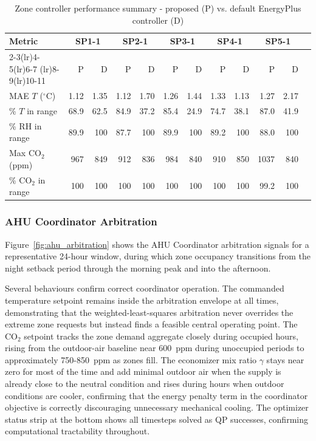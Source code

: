 \documentclass[12pt, a4paper]{article}
\begin{document}
	\begin{table}[htbp]
		\centering
		\small
		\caption{Zone controller performance summary - proposed (P) vs.
			default EnergyPlus controller (D)}
		\label{tab:zone_perf}
		\begin{tabular}{lrrrrrrrrrrr}
			\toprule
			\textbf{Metric}
			& \multicolumn{2}{c}{\textbf{SP1-1}}
			& \multicolumn{2}{c}{\textbf{SP2-1}}
			& \multicolumn{2}{c}{\textbf{SP3-1}}
			& \multicolumn{2}{c}{\textbf{SP4-1}}
			& \multicolumn{2}{c}{\textbf{SP5-1}} \\
			\cmidrule(lr){2-3}\cmidrule(lr){4-5}\cmidrule(lr){6-7}
			\cmidrule(lr){8-9}\cmidrule(lr){10-11}
			& P & D & P & D & P & D & P & D & P & D \\
			\midrule
			MAE $T$ ($^\circ$C)     & 1.12 & 1.35 & 1.12 & 1.70 & 1.26 & 1.44 & 1.33 & 1.13 & 1.27 & 2.17 \\
			\% $T$ in range         & 68.9 & 62.5 & 84.9 & 37.2 & 85.4 & 24.9 & 74.7 & 38.1 & 87.0 & 41.9 \\
			\% RH in range          & 89.9 & 100  & 87.7 & 100  & 89.9 & 100  & 89.2 & 100  & 88.0 & 100  \\
			Max CO$_2$ (ppm)        &  967 &  849 &  912 &  836 &  984 &  840 &  910 &  850 & 1037 &  840 \\
			\% CO$_2$ in range      & 100  & 100  & 100  & 100  & 100  & 100  & 100  & 100  & 99.2 & 100  \\
			\bottomrule
		\end{tabular}
	\end{table}
	
	\subsubsection{AHU Coordinator Arbitration}
	
	Figure~\ref{fig:ahu_arbitration} shows the AHU Coordinator arbitration
	signals for a representative 24-hour window, during which
	zone occupancy transitions from the night setback period through the
	morning peak and into the afternoon.
	
	Several behaviours confirm correct coordinator operation.  The
	commanded temperature setpoint remains inside the arbitration envelope
	at all times, demonstrating that the weighted-least-squares arbitration
	never overrides the extreme zone requests but instead finds a feasible
	central operating point.  The CO$_2$ setpoint tracks the zone demand
	aggregate closely during occupied hours, rising from the outdoor-air
	baseline near 600~ppm during unoccupied periods to approximately
	750-850~ppm as zones fill.  The economizer mix ratio $\gamma$ stays
	near zero for most of the time and add minimal outdoor air when the supply
	is already close to the neutral condition and rises during	hours when outdoor conditions are cooler, confirming that the energy	penalty term in the coordinator objective is correctly discouraging
	unnecessary mechanical cooling.  The optimizer status strip at
	the bottom shows all timesteps solved as QP successes, confirming
	computational tractability throughout.
	
\end{document}
